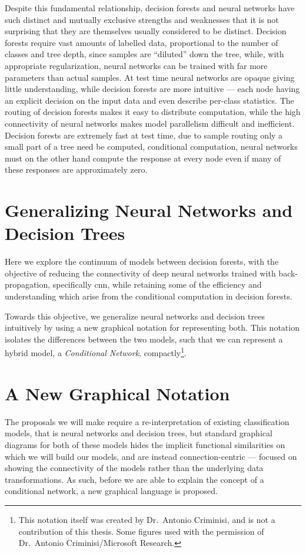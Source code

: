 \documentclass[thesis]{subfiles}
\begin{document}
	Despite this fundamental relationship, decision forests and neural networks have such distinct and mutually exclusive strengths and weaknesses that it is not surprising that they are themselves usually considered to be distinct. Decision forests require vast amounts of labelled data, proportional to the number of classes and tree depth, since samples are ``diluted'' down the tree, while, with appropriate regularization, neural networks can be trained with far more parameters than actual samples. At test time neural networks are opaque giving little understanding, while decision forests are more intuitive --- each node having an explicit decision on the input data and even describe per-class statistics. The routing of decision forests makes it easy to distribute computation, while the high connectivity of neural networks makes model parallelism difficult and inefficient. Decision forests are extremely fast at test time, due to sample routing only a small part of a tree need be computed, \ie{}conditional computation, neural networks must on the other hand compute the response at every node even if many of these responses are approximately zero.
	
	\section{Generalizing Neural Networks and Decision Trees}
	Here we explore the continuum of models between decision forests, with the objective of reducing the connectivity of deep neural networks trained with back-propagation, specifically \gls{cnn}, while retaining some of the efficiency and understanding which arise from the conditional computation in decision forests.
	
	Towards this objective, we generalize neural networks and decision trees intuitively by using a new graphical notation for representing both. This notation isolates the differences between the two models, such that we can represent a hybrid model, \ie a \emph{Conditional Network}, compactly\footnote{This notation itself was created by Dr.\ Antonio Criminisi, and is not a contribution of this thesis. Some figures used with the permission of Dr.\ Antonio Criminisi/Microsoft Research.}.
	
	\section{A New Graphical Notation}
	The proposals we will make require a re-interpretation of existing classification models, that is neural networks and decision trees, but standard graphical diagrams for both of these models hides the implicit functional similarities on which we will build our models, and are instead connection-centric --- focused on showing the connectivity of the models rather than the underlying data transformations. As such, before we are able to explain the concept of a conditional network, a new graphical language is proposed.
	
\end{document}

